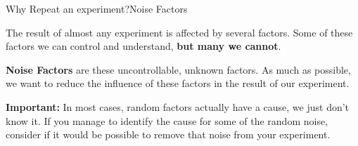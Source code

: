 \begin{frame}{Why Repeat an experiment?}{Noise Factors}

  The result of almost any experiment is affected by several
  factors. Some of these factors we can control and understand, {\bf
    but many we cannot}.\bigskip

  {\bf Noise Factors} are these uncontrollable, unknown factors. As
  much as possible, we want to reduce the influence of these factors
  in the result of our experiment.\bigskip

  \alert{{\bf Important:} In most cases, random factors actually have a
    cause, we just don't know it. If you manage to identify the cause
    for some of the random noise, consider if it would be possible to
    remove that noise from your experiment}.
\end{frame}

